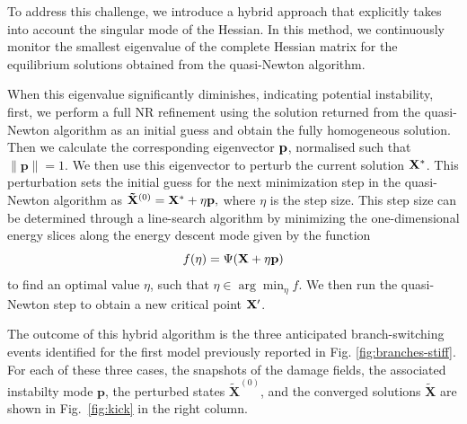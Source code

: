 To address this challenge, we introduce a hybrid approach {that explicitly takes into account the singular mode of the Hessian}. In this method, we continuously monitor the smallest eigenvalue of the complete {Hessian} matrix for the equilibrium solutions obtained from the quasi-Newton algorithm.

When this eigenvalue significantly diminishes, indicating potential instability, first, we perform a full NR refinement using the solution returned from the quasi-Newton algorithm as an initial guess and obtain the fully homogeneous solution. Then we calculate the corresponding eigenvector \(\mathbf{p}\), normalised such that $\|\textbf{p}\|=1$. 
We then use this eigenvector to perturb the current solution $\mathbf{X^*}$. This perturbation sets the initial guess for the next minimization step in the quasi-Newton algorithm as $\mathbf{\tilde X}^{(0)} = \mathbf{X^*} + \eta \mathbf{p},
$ where \(\eta\) is the step size.
This step size can be determined through a line-search algorithm by minimizing the one-dimensional energy slices along the energy descent mode given by the function 
$$f(\eta) = \Psi(\mathbf{X} + \eta \mathbf{p})
\label{eqn:energy-slice}$$
 to find an optimal value \(\eta\), such that $\eta \in \arg \min_{\eta} f$. {We then run the quasi-Newton step to obtain a new critical point $\mathbf{X}'$.}

The outcome of this hybrid algorithm is the three anticipated branch-switching events identified for the first model previously reported in Fig. \ref{fig:branches-stiff}. For each of these three cases, the snapshots of the damage fields, the associated {instabilty mode} \(\mathbf{p}\), the perturbed states \(\mathbf{\tilde X}^{(0)}\), and the converged solutions $\mathbf{\tilde X}$ are shown in Fig.~\ref{fig:kick} in the right column.


